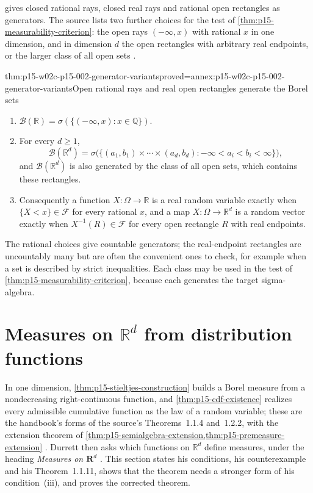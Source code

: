  gives closed rational rays, closed real
rays and rational open rectangles as generators. The source lists two
further choices for the test of \cref{thm:p15-measurability-criterion}:
the open rays \((-\infty,x)\) with rational \(x\) in one dimension, and
in dimension \(d\) the open rectangles with arbitrary real endpoints, or
the larger class of all open sets
\cite[Examples~1.3.2--1.3.3, p.~15]{DurrettPTEAuthor2019}.

\begin{hbtheorem}{thm:p15-w02c-p15-002-generator-variants}{proved=annex:p15-w02c-p15-002-generator-variants}{Open rational rays and real open rectangles generate the Borel sets}
\begin{enumerate}
\item \(\mathcal B(\mathbb R)=\sigma(\{(-\infty,x):x\in\mathbb Q\})\).
\item For every \(d\geq1\),
      \[
       \mathcal B(\mathbb R^d)
       =\sigma\bigl(\{(a_1,b_1)\times\cdots\times(a_d,b_d):
              -\infty<a_i<b_i<\infty\}\bigr),
      \]
      and \(\mathcal B(\mathbb R^d)\) is also generated by the class of
      all open sets, which contains these rectangles.
\item Consequently a function \(X:\Omega\to\mathbb R\) is a real random
      variable exactly when \(\{X<x\}\in\mathcal F\) for every rational
      \(x\), and a map \(X:\Omega\to\mathbb R^d\) is a random vector
      exactly when \(X^{-1}(R)\in\mathcal F\) for every open rectangle
      \(R\) with real endpoints.
\end{enumerate}
\end{hbtheorem}

The rational choices give countable generators; the real-endpoint
rectangles are uncountably many but are often the convenient ones to
check, for example when a set is described by strict inequalities. Each
class may be used in the test of \cref{thm:p15-measurability-criterion},
because each generates the target sigma-algebra.

\section{Measures on \texorpdfstring{\(\mathbb R^d\)}{R d} from distribution functions}
\label{sec:p15-w02c-p15-002-rd-measures}

In one dimension, \cref{thm:p15-stieltjes-construction} builds a Borel
measure from a nondecreasing right-continuous function, and
\cref{thm:p15-cdf-existence} realizes every admissible cumulative function
as the law of a random variable; these are the handbook's forms of the
source's Theorems~1.1.4 and~1.2.2, with the extension theorem of
\cref{thm:p15-semialgebra-extension,thm:p15-premeasure-extension}
\cite[Theorems~1.1.4, 1.2.2, pp.~3, 11]{DurrettPTEAuthor2019}. Durrett
then asks which functions on \(\mathbb R^d\) define measures, under the
heading \emph{Measures on \(\mathbf R^d\)}
\cite[pp.~6--9]{DurrettPTEAuthor2019}. This section states his
conditions, his counterexample and his Theorem~1.1.11, shows that the
theorem needs a stronger form of his condition~(iii), and proves the
corrected theorem.

